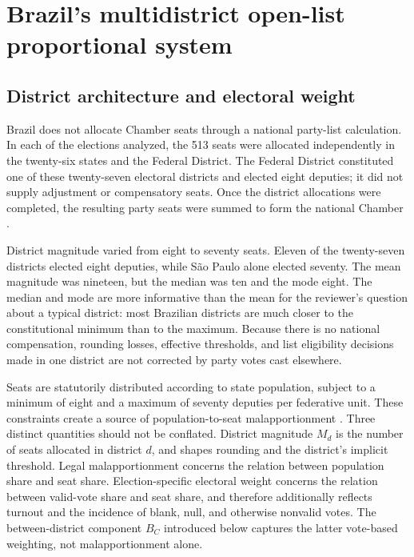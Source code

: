 \documentclass[11pt]{article}
\begin{document}
\section{Brazil's multidistrict open-list proportional system}
\label{sec:brazil-system}

\subsection{District architecture and electoral weight}

Brazil does not allocate Chamber seats through a national party-list
calculation. In each of the elections analyzed, the 513 seats were allocated
independently in the twenty-six states and the Federal District. The Federal
District constituted one of these twenty-seven electoral districts and elected
eight deputies; it did not supply adjustment or compensatory seats. Once the
district allocations were completed, the resulting party seats were summed to
form the national Chamber \parencite{camaraDeputadosNumeroEstados}.

District magnitude varied from eight to seventy seats. Eleven of the
twenty-seven districts elected eight deputies, while São Paulo alone elected
seventy. The mean magnitude was nineteen, but the median was ten and the
mode eight. The median and mode are more informative than the mean for the
reviewer's question about a typical district: most Brazilian districts are much
closer to the constitutional minimum than to the maximum. Because there is
no national compensation, rounding losses, effective thresholds, and list
eligibility decisions made in one district are not corrected by party votes cast
elsewhere.

Seats are statutorily distributed according to state population, subject to a
minimum of eight and a maximum of seventy deputies per federative unit.
These constraints create a source of population-to-seat malapportionment
\parencite{samuelsSnyder2001value}. Three distinct quantities should not be
conflated. District magnitude \(M_d\) is the number of seats allocated in
district \(d\), and shapes rounding and the district's implicit threshold.
Legal malapportionment concerns the relation between population share and
seat share. Election-specific electoral weight concerns the relation between
valid-vote share and seat share, and therefore additionally reflects turnout
and the incidence of blank, null, and otherwise nonvalid votes. The
between-district component \(B_C\) introduced below captures the latter
vote-based weighting, not malapportionment alone.
\end{document}
